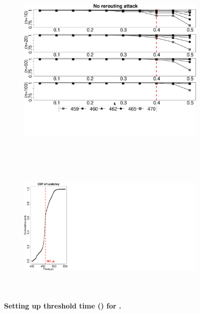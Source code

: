 \else

\begin{figure}[t!]
    \centering
    \begin{subfigure}[t]{0.66\textwidth}
        \centering
         \includegraphics[trim={0 5cm 0 0}, clip, width=\linewidth]{data/graph/timeRound_new.pdf}
        \caption{\timeRoundCaption}
        \label{graph:diffTh}
    \end{subfigure}%
    ~ ~~
    \begin{subfigure}[t]{0.33\textwidth}
        \centering
        \includegraphics[trim={-0.6in 0cm 24cm 0}, clip, height=2.7in]{data/graph/CDF_Latency2.pdf}
        \caption{\cumulativeCaption}
        \label{fig:cdf}
    \end{subfigure}
    \caption{\textbf{Setting up threshold time (\connect) for \name.}}
\end{figure}

